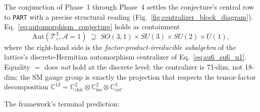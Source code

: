 The conjunction of Phase~1 through Phase~4 settles the conjecture's
central row to \texttt{PART} with a precise structural reading
(Fig.~\ref{fig:centralizer_block_diagram}).
Eq.~\eqref{eq:automorphism_conjecture} holds as containment
\begin{equation}
\label{eq:containment_again}
\mathrm{Aut}(\mathcal{T}_\diamond^3, \mathcal{A}=1)
\;\supseteq\;
SO(3,1) \times SU(3) \times SU(2) \times U(1),
\end{equation}
where the right-hand side is the \emph{factor-product-irreducible
subalgebra} of the lattice's discrete-Hermitian automorphism
centralizer of Eq.~\eqref{eq:su6_su6_u1}.  Equality $=$ does
\emph{not} hold at the discrete level: the centralizer is 71-dim,
not 18-dim; the SM gauge group is exactly the projection that
respects the tensor-factor decomposition
$\mathbb{C}^{12} = \mathbb{C}^2_\text{chir} \otimes
\mathbb{C}^2_\text{iso} \otimes \mathbb{C}^3_\text{col}$.

The framework's terminal prediction:

